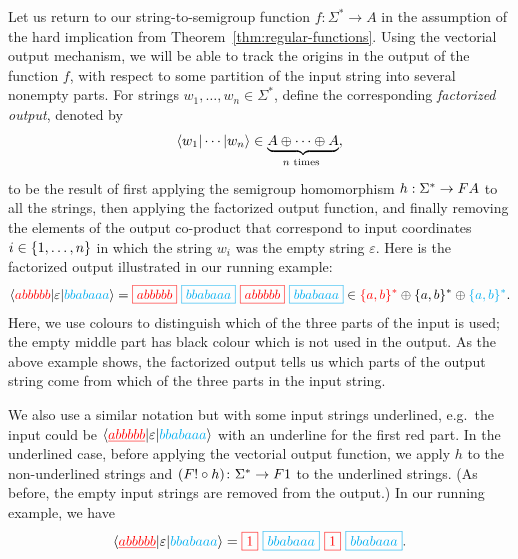 Let us return to our string-to-semigroup function $f : \Sigma^* \to A$ in the assumption of the hard implication from Theorem~\ref{thm:regular-functions}.
Using the vectorial output mechanism, we will be able to track the origins in the output of the function $f$, with respect to some partition of the input string into several nonempty parts.
For  strings $w_1,\ldots,w_n \in \Sigma^*$, define the corresponding \emph{factorized output}, denoted by 
\begin{align*}
\tuple{w_1| \cdots | w_n} \in \myunderbrace{A \oplus \cdots \oplus A}{$n$ times},
\end{align*}
to be the result of first applying the semigroup homomorphism $h : \Sigma^* \to \functor A$ to all the strings, then applying the factorized output function, and finally removing the elements of the output co-product that correspond to input coordinates $i \in \{1,\ldots,n\}$ in which the string $w_i$ was the empty string $\varepsilon$.
Here is the factorized output illustrated in our running example:\begin{align*}
        \tuple{\red{abbbbb} | \varepsilon | \blue{bbabaaa}} =  
        \red{\boxed{abbbbb}} \ 
        \blue{\boxed{bbabaaa}} \ 
        \red{\boxed{abbbbb}} \ 
        \blue{\boxed{bbabaaa}} \in \red{\set{a,b}^*} \oplus \set{a,b}^*  \oplus \blue{\set{a,b}^*}.
        \end{align*}
    Here, we use colours to distinguish which of the three parts of the input is used; the empty middle part has black colour which is not used in the output. As the above example shows, the factorized output tells us which parts of the output string come from which of the three parts in the input string.


We also use a similar notation but with some input strings underlined, e.g.~the input could be $\langle {\color{red}\underline{abbbbb}} | \varepsilon | {\color{cyan}bbabaaa} \rangle$ with an underline for the first red part. In the underlined case, before applying the vectorial output function, we apply $h$ to the non-underlined strings and
$(\functor! \circ h) \colon \Sigma^* \to \functor1$
to the underlined strings. (As before, the empty input strings are removed from the output.)    In our running example, we have
    \begin{align*}
        \tuple{\red{\underline{abbbbb}} | \varepsilon | \blue{bbabaaa}} =  
        \red{\boxed{1}} \ 
        \blue{\boxed{bbabaaa}} \ 
        \red{\boxed{1}} \ 
        \blue{\boxed{bbabaaa}}.
        \end{align*}



